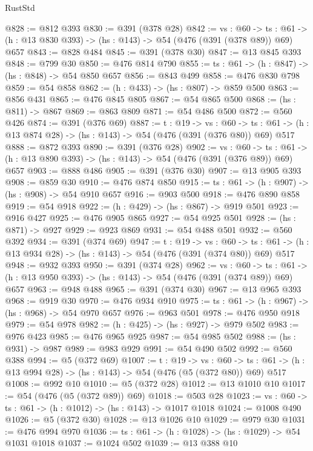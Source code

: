 \begin{lexlean}{RustStd}
\begin{coremodule}
{\begin{coremodule}
{{{{{{{@828 := @812 @393
@830 := @391 (@378 @28)
@842 := {vs : @60} ->
  {ts : @61} -> (h : @13 @830 @393) -> (hs : @143) -> @54 (@476 (@391 (@378 @89)) @69) @657
@843 := @828 @484
@845 := @391 (@378 @30)
@847 := @13 @845 @393
@848 := @799 @30
@850 := @476 @814 @790
@855 := {ts : @61} -> (h : @847) -> (hs : @848) -> @54 @850 @657
@856 := @843 @499
@858 := @476 @830 @798
@859 := @54 @858
@862 := (h : @433) -> (hs : @807) -> @859 @500
@863 := @856 @431
@865 := @476 @845 @805
@867 := @54 @865 @500
@868 := (hs : @811) -> @867
@869 := @863 @809
@871 := @54 @486 @500
@872 := @560 @426
@874 := @391 (@376 @69)
@887 := {t : @19} ->
  {vs : @60} ->
  {ts : @61} -> (h : @13 @874 @28) -> (hs : @143) -> @54 (@476 (@391 (@376 @80)) @69) @517
@888 := @872 @393
@890 := @391 (@376 @28)
@902 := {vs : @60} ->
  {ts : @61} -> (h : @13 @890 @393) -> (hs : @143) -> @54 (@476 (@391 (@376 @89)) @69) @657
@903 := @888 @486
@905 := @391 (@376 @30)
@907 := @13 @905 @393
@908 := @859 @30
@910 := @476 @874 @850
@915 := {ts : @61} -> (h : @907) -> (hs : @908) -> @54 @910 @657
@916 := @903 @500
@918 := @476 @890 @858
@919 := @54 @918
@922 := (h : @429) -> (hs : @867) -> @919 @501
@923 := @916 @427
@925 := @476 @905 @865
@927 := @54 @925 @501
@928 := (hs : @871) -> @927
@929 := @923 @869
@931 := @54 @488 @501
@932 := @560 @392
@934 := @391 (@374 @69)
@947 := {t : @19} ->
  {vs : @60} ->
  {ts : @61} -> (h : @13 @934 @28) -> (hs : @143) -> @54 (@476 (@391 (@374 @80)) @69) @517
@948 := @932 @393
@950 := @391 (@374 @28)
@962 := {vs : @60} ->
  {ts : @61} -> (h : @13 @950 @393) -> (hs : @143) -> @54 (@476 (@391 (@374 @89)) @69) @657
@963 := @948 @488
@965 := @391 (@374 @30)
@967 := @13 @965 @393
@968 := @919 @30
@970 := @476 @934 @910
@975 := {ts : @61} -> (h : @967) -> (hs : @968) -> @54 @970 @657
@976 := @963 @501
@978 := @476 @950 @918
@979 := @54 @978
@982 := (h : @425) -> (hs : @927) -> @979 @502
@983 := @976 @423
@985 := @476 @965 @925
@987 := @54 @985 @502
@988 := (hs : @931) -> @987
@989 := @983 @929
@991 := @54 @490 @502
@992 := @560 @388
@994 := @5 (@372 @69)
@1007 := {t : @19} ->
  {vs : @60} ->
  {ts : @61} -> (h : @13 @994 @28) -> (hs : @143) -> @54 (@476 (@5 (@372 @80)) @69) @517
@1008 := @992 @10
@1010 := @5 (@372 @28)
@1012 := @13 @1010 @10
@1017 := @54 (@476 (@5 (@372 @89)) @69)
@1018 := @503 @28
@1023 := {vs : @60} -> {ts : @61} -> (h : @1012) -> (hs : @143) -> @1017 @1018
@1024 := @1008 @490
@1026 := @5 (@372 @30)
@1028 := @13 @1026 @10
@1029 := @979 @30
@1031 := @476 @994 @970
@1036 := {ts : @61} -> (h : @1028) -> (hs : @1029) -> @54 @1031 @1018
@1037 := @1024 @502
@1039 := @13 @388 @10
}}}}}}}
\end{coremodule}}
\end{coremodule}
\end{lexlean}
